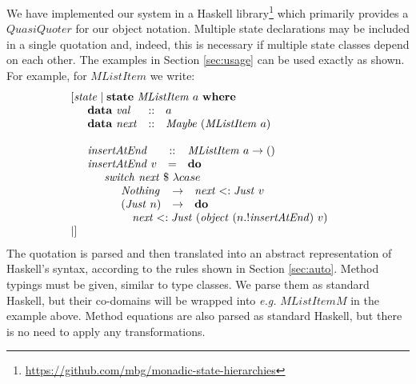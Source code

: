 \documentclass[authoryear,preprint]{sigplanconf}
\begin{document}
We have implemented our system in a Haskell library\footnote{\url{https://github.com/mbg/monadic-state-hierarchies}} which primarily provides a $\mathit{QuasiQuoter}$ \citep{mainland2007s} for our object notation. Multiple state declarations may be included in a single quotation and, indeed, this is necessary if multiple state classes depend on each other. The examples in Section \ref{sec:usage} can be used exactly as shown. For example, for $\mathit{MListItem}$ we write:
\begin{displaymath}
\begin{array}{l}
[\mathit{state}\mid \mathbf{state}~\mathit{MListItem}~a~\mathbf{where} \\
\quad \begin{array}{lcl}
\mathbf{data}~\mathit{val} & :: & a \\
\mathbf{data}~\mathit{next}  & :: & \mathit{Maybe}~(\mathit{MListItem}~a)
\end{array}\\\\
\quad \begin{array}{lcl}
\mathit{insertAtEnd} & :: & \mathit{MListItem}~a \to ()\\
\mathit{insertAtEnd}~v & = & \mathbf{do} \\
\multicolumn{3}{l}{\quad \begin{array}{l}
    \mathit{switch}~\mathit{next}~\$~\lambda case \\
    \quad \begin{array}{lcl}
    \mathit{Nothing} & \to & \mathit{next} <: \mathit{Just}~v  \\
    (\mathit{Just}~n) & \to & \mathbf{do} \\
    \multicolumn{3}{l}{\quad \mathit{next} <: \mathit{Just}~(\mathit{object}~(n.!\mathit{insertAtEnd})~v) }
    \end{array}
    \end{array}}
\end{array}\\\mid]
\end{array}
\end{displaymath}
The quotation is parsed and then translated into an abstract representation of Haskell's syntax, according to the rules shown in Section \ref{sec:auto}. Method typings must be given, similar to type classes. We parse them as standard Haskell, but their co-domains will be wrapped into \emph{e.g.} $\mathit{MListItemM}$ in the example above. Method equations are also parsed as standard Haskell, but there is no need to apply any transformations. 
\end{document}

